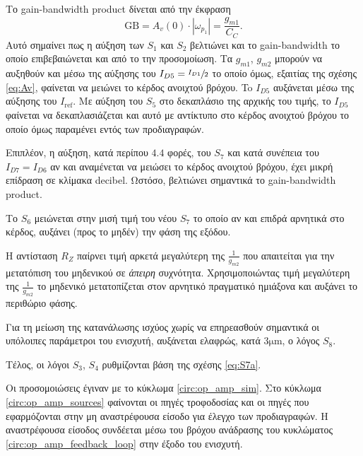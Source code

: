 Το gain-bandwidth product δίνεται από την έκφραση
\begin{equation}
	\mathrm{GB}=A_v(0)\cdot|\omega_{p_1}|=\frac{g_{m1}}{C_C}.
\end{equation}
Αυτό σημαίνει πως η αύξηση των $S_1$ και $S_2$ βελτιώνει και το gain-bandwidth το οποίο επιβεβαιώνεται και από το την προσομοίωση. Τα $g_{m1}$, $g_{m2}$ μπορούν να αυξηθούν και μέσω της αύξησης του $I_{D5}=\sfrac{I_{D1}}{2}$ το οποίο όμως, εξαιτίας της σχέσης \ref{eq:Av}, φαίνεται να μειώνει το κέρδος ανοιχτού βρόχου. To $I_{D5}$ αυξάνεται μέσω της αύξησης του $I_{\mathrm{ref}}$. Με αύξηση του $S_5$ στο δεκαπλάσιο της αρχικής του τιμής, το $I_{D5}$ φαίνεται να δεκαπλασιάζεται και αυτό με αντίκτυπο στο κέρδος ανοιχτού βρόχου το οποίο όμως παραμένει εντός των προδιαγραφών.\par
Επιπλέον, η αύξηση, κατά περίπου $4.4$ φορές, του $S_7$ και κατά συνέπεια του $I_{D7}=I_{D6}$ αν και αναμένεται να μειώσει το κέρδος ανοιχτού βρόχου, έχει μικρή επίδραση σε κλίμακα decibel. Ωστόσο, βελτιώνει σημαντικά το gain-bandwidth product.\par
Το $S_6$ μειώνεται στην μισή τιμή του νέου $S_7$ το οποίο αν και επιδρά αρνητικά στο κέρδος, αυξάνει (προς το μηδέν) την φάση της εξόδου.\par
Η αντίσταση $R_Z$ παίρνει τιμή αρκετά μεγαλύτερη της $\frac{1}{g_{m2}}$ που απαιτείται για την μετατόπιση του μηδενικού σε \textsl{άπειρη} συχνότητα.\cite{sedra} Χρησιμοποιώντας τιμή μεγαλύτερη της $\frac{1}{g_{m2}}$ το μηδενικό μετατοπίζεται στον αρνητικό πραγματικό ημιάξονα και αυξάνει το περιθώριο φάσης.\cite{sedra}\par
Για τη μείωση της κατανάλωσης ισχύος χωρίς να επηρεασθούν σημαντικά οι υπόλοιπες παράμετροι του ενισχυτή, αυξάνεται ελαφρώς, κατά $3\unit{\micro\meter}$, ο λόγος $S_8$.\par
Τέλος, οι λόγοι $S_3$, $S_4$ ρυθμίζονται βάση της σχέσης \eqref{eq:S7a}.\par

Οι προσομοιώσεις έγιναν με το κύκλωμα \ref{circ:op_amp_sim}. Στο κύκλωμα \ref{circ:op_amp_sources} φαίνονται οι πηγές τροφοδοσίας και οι πηγές που εφαρμόζονται στην μη αναστρέφουσα είσοδο για έλεγχο των προδιαγραφών. Η αναστρέφουσα είσοδος συνδέεται μέσω του βρόχου ανάδρασης του κυκλώματος \ref{circ:op_amp_feedback_loop} στην έξοδο του ενισχυτή. \par

